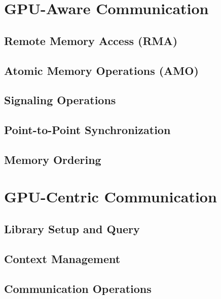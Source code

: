 \documentclass[10pt,oneside]{book}
\begin{document}
\section{GPU-Aware Communication}\label{sec:gpu_aware}

\subsection{Remote Memory Access (RMA)}\label{subsec:gpu_aware_rma}

\subsection{Atomic Memory Operations (AMO)}\label{subsec:gpu_aware_amo}

\subsection{Signaling Operations}\label{subsec:gpu_aware_signaling}

\subsection{Point-to-Point Synchronization}\label{subsec:gpu_aware_p2p}

\subsection{Memory Ordering}\label{subsec:gpu_aware_ordering}



\section{GPU-Centric Communication}\label{sec:gpu_centric}

\subsection{Library Setup and Query}\label{subsec:gc_setup}

\subsection{Context Management}\label{subsec:gc_context}

\subsection{Communication Operations}\label{subsec:gc_comm_ops}

\end{document}
